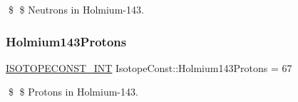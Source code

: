 \$ \$ Neutrons in Holmium-\/143. \mbox{\label{group___isotope_const-_holmium-_ho143_gaf318eff1d5fa6b2cca7ecc9c47b58888}} 
\subsubsection{\texorpdfstring{Holmium143\+Protons}{Holmium143Protons}}
{\footnotesize\ttfamily \mbox{\hyperlink{group___isotope_const-_macros_ga5f18360b3e99483a35c32d789e62621c}{I\+S\+O\+T\+O\+P\+E\+C\+O\+N\+S\+T\+\_\+\+I\+NT}} Isotope\+Const\+::\+Holmium143\+Protons = 67}

\$ \$ Protons in Holmium-\/143. 